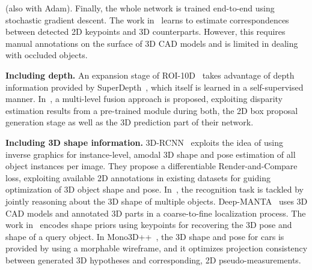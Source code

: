 \documentclass[10pt,twocolumn,letterpaper]{article}
\renewcommand{\paragraph}[1]{

        \vspace{3pt}
	\noindent\textbf{#1}}
\begin{document}
(also with Adam). Finally, the whole network is trained end-to-end using stochastic gradient descent. The work in~\cite{Barabanau_arXiv_2019} learns to estimate correspondences between detected 2D keypoints and 3D counterparts. However, this requires manual annotations on the surface of 3D CAD models and is limited in dealing with occluded objects.

\paragraph{Including depth.} 
An expansion stage of ROI-10D~\cite{Manhardt_2019_CVPR} takes advantage of depth information provided by SuperDepth~\cite{Pillai_2019_ICRA}, which itself is learned in a self-supervised manner. In~\cite{Xu_2018_CVPR}, a multi-level fusion approach is proposed, exploiting disparity estimation results from a pre-trained module during both, the 2D box proposal generation stage as well as the 3D prediction part of their network. 

\paragraph{Including 3D shape information.}
3D-RCNN~\cite{Kundu_2018_CVPR} exploits the idea of using inverse graphics for instance-level, amodal 3D shape and pose estimation of all object instances per image. They propose a differentiable Render-and-Compare loss, exploiting available 2D annotations in existing datasets for guiding optimization of 3D object shape and pose. In~\cite{Zia_2014_CVPR}, the recognition task is tackled by jointly reasoning about the 3D shape of multiple objects. Deep-MANTA~\cite{Chabot_2017_CVPR} uses 3D CAD models and annotated 3D parts in a coarse-to-fine localization process. The work in~\cite{Murthy_17_ICRA} encodes shape priors using keypoints for recovering the 3D pose and shape of a query object. In Mono3D++~\cite{TongHe_2019_arxiv}, the 3D shape and pose for cars is provided by using a morphable wireframe, and it optimizes projection consistency between generated 3D hypotheses and corresponding, 2D pseudo-measurements.
\end{document}
